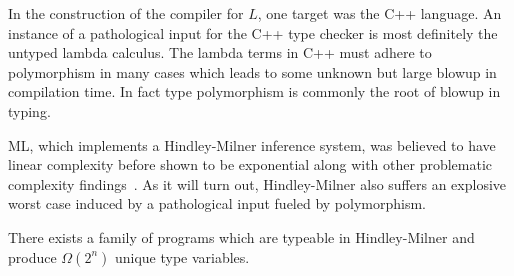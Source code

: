 In the construction of the compiler for $L$, one target was the C++ language.
An instance of a pathological input for the C++ type checker is most definitely the untyped lambda calculus.
The lambda terms in C++ must adhere to polymorphism in many cases which leads to some unknown but large blowup in compilation time.
In fact type polymorphism is commonly the root of blowup in typing.

ML, which implements a Hindley-Milner inference system, was believed to have linear complexity before shown to be exponential along with other problematic complexity findings~\cite{mairson1989deciding}.
As it will turn out, Hindley-Milner also suffers an explosive worst case induced by a pathological input fueled by polymorphism.

\begin{lemma}
    There exists a family of programs which are typeable in Hindley-Milner and produce $\Omega(2^n)$ unique type variables.
\end{lemma}
